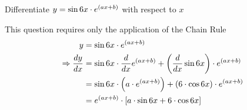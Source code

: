 


\question[1] Differentiate $y = \sin6 x\cdot e^{(ax + b)}$ with respect to $x$


\watchout

\ifprintanswers
\fi 

\begin{solution}[\mcq]
	This question requires only the application of the Chain Rule 
	\begin{align}
		y &= \sin6 x\cdot e^{(ax + b)} \nonumber\\
	   \Rightarrow \dfrac{dy}{dx} &= \sin6 x\cdot\dfrac{d}{dx}e^{(ax + b)} 
	   + \left(\dfrac{d}{dx}\sin6 x\right)\cdot e^{(ax + b)} \\
	   &= \sin6 x\cdot\left( a\cdot e^{(ax + b)}\right) + 
	   \left( 6\cdot\cos6 x\right)\cdot e^{(ax+b)} \\
	   &= e^{(ax+b)}\cdot\left[ a\cdot\sin6 x + 6\cdot\cos6 x\right]
	\end{align}
\end{solution}

